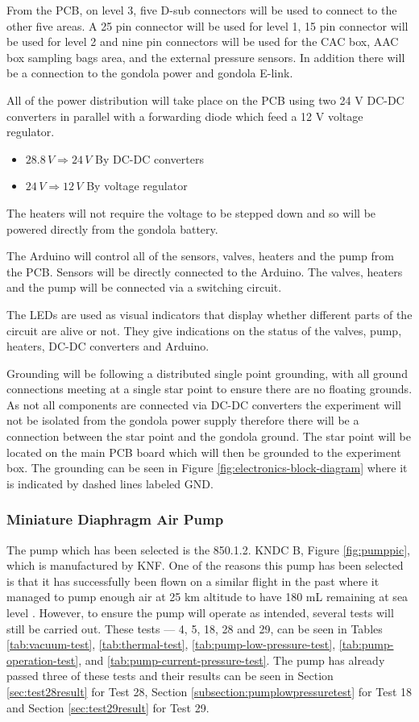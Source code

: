 \documentclass[a4paper,12pt,twoside]{article}
\begin{document}
From the PCB, on level 3, five D-sub connectors will be used to connect to the other five areas. A 25 pin connector will be used for level 1, 15 pin connector will be used for level 2 and nine pin connectors will be used for the CAC box, AAC box sampling bags area, and the external pressure sensors. In addition there will be a connection to the gondola power and gondola E-link.

All of the power distribution will take place on the PCB using two 24 V DC-DC converters in parallel with a forwarding diode which feed a 12 V voltage regulator. 
\begin{itemize}
  \item $28.8 \, V \Longrightarrow 24 \, V $ By DC-DC converters
  \item $24 \, V \Longrightarrow 12 \, V$ By voltage regulator
  \end{itemize}
The heaters will not require the voltage to be stepped down and so will be powered directly from the gondola battery.

The Arduino will control all of the sensors, valves, heaters and the pump from the PCB. Sensors will be directly connected to the Arduino. The valves, heaters and the pump will be connected via a switching circuit.

The LEDs are used as visual indicators that display whether different parts of the circuit are alive or not. They give indications on the status of the valves, pump, heaters, DC-DC converters and Arduino. 

Grounding will be following a distributed single point grounding, with all ground connections meeting at a single star point to ensure there are no floating grounds. As not all components are connected via DC-DC converters the experiment will not be isolated from the gondola power supply therefore there will be a connection between the star point and the gondola ground. The star point will be located on the main PCB board which will then be grounded to the experiment box. The grounding can be seen in Figure \ref{fig:electronics-block-diagram} where it is indicated by dashed lines labeled GND. 

\subsubsection{Miniature Diaphragm Air Pump}
The pump which has been selected is the 850.1.2. KNDC B, Figure \ref{fig:pumppic}, which is manufactured by KNF. One of the reasons this pump has been selected is that it has successfully been flown on a similar flight in the past where it managed to pump enough air at 25 km altitude to have 180 mL remaining at sea level \cite{LISA}. However, to ensure the pump will operate as intended, several tests will still be carried out. These tests --- 4, 5, 18, 28 and 29, can be seen in Tables \ref{tab:vacuum-test}, \ref{tab:thermal-test}, \ref{tab:pump-low-pressure-test}, \ref{tab:pump-operation-test}, and \ref{tab:pump-current-pressure-test}. The pump has already passed three of these tests and their results can be seen in Section \ref{sec:test28result} for Test 28, Section \ref{subsection:pumplowpressuretest} for Test 18 and Section \ref{sec:test29result} for Test 29.
\end{document}

